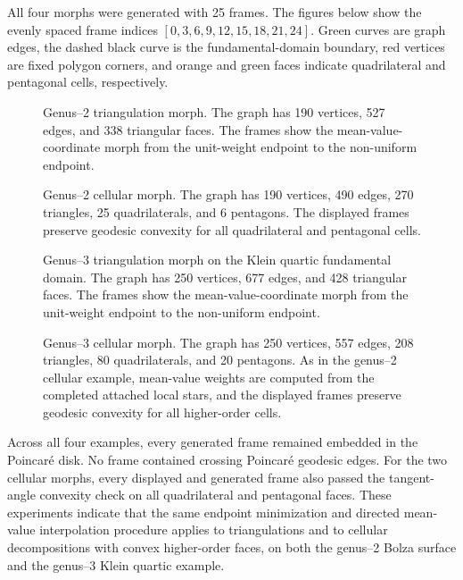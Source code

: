 \documentclass[12pt]{article}
\theoremstyle{definition}
\theoremstyle{remark}
\numberwithin{equation}{section}
\begin{document}
All four morphs were generated with 25 frames. The figures below show the evenly spaced frame indices $[0,3,6,9,12,15,18,21,24]$. Green curves are graph edges, the dashed black curve is the fundamental-domain boundary, red vertices are fixed polygon corners, and orange and green faces indicate quadrilateral and pentagonal cells, respectively.

\begin{figure}[t]
\centering

\caption{Genus--2 triangulation morph. The graph has 190 vertices, 527 edges, and 338 triangular faces. The frames show the mean-value-coordinate morph from the unit-weight endpoint to the non-uniform endpoint.}
\label{fig:g2-triangulation-morph}
\end{figure}

\begin{figure}[t]
\centering

\caption{Genus--2 cellular morph. The graph has 190 vertices, 490 edges, 270 triangles, 25 quadrilaterals, and 6 pentagons. The displayed frames preserve geodesic convexity for all quadrilateral and pentagonal cells.}
\label{fig:g2-cells-morph}
\end{figure}

\begin{figure}[t]
\centering

\caption{Genus--3 triangulation morph on the Klein quartic fundamental domain. The graph has 250 vertices, 677 edges, and 428 triangular faces. The frames show the mean-value-coordinate morph from the unit-weight endpoint to the non-uniform endpoint.}
\label{fig:g3-triangulation-morph}
\end{figure}

\begin{figure}[t]
\centering

\caption{Genus--3 cellular morph. The graph has 250 vertices, 557 edges, 208 triangles, 80 quadrilaterals, and 20 pentagons. As in the genus--2 cellular example, mean-value weights are computed from the completed attached local stars, and the displayed frames preserve geodesic convexity for all higher-order cells.}
\label{fig:g3-cells-morph}
\end{figure}

Across all four examples, every generated frame remained embedded in the Poincaré disk. No frame contained crossing Poincaré geodesic edges. For the two cellular morphs, every displayed and generated frame also passed the tangent-angle convexity check on all quadrilateral and pentagonal faces. These experiments indicate that the same endpoint minimization and directed mean-value interpolation procedure applies to triangulations and to cellular decompositions with convex higher-order faces, on both the genus--2 Bolza surface and the genus--3 Klein quartic example.
\end{document}
